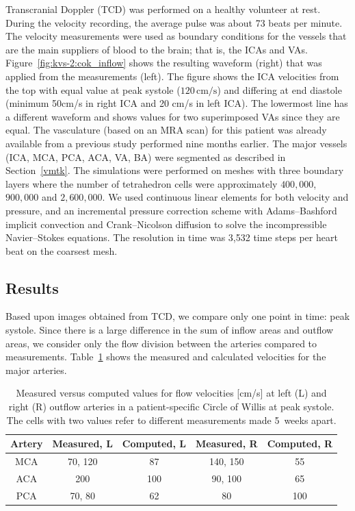 Transcranial Doppler (TCD) was performed on a healthy volunteer at
rest. During the velocity recording, the average pulse was about 73
beats per minute. The velocity measurements were used as boundary
conditions for the vessels that are the main suppliers of blood to the
brain; that is, the ICAs and VAs. Figure~\ref{fig:kvs-2:cok_inflow}
shows the resulting waveform (right) that was applied from the
measurements (left). The figure shows the ICA velocities from the top
with equal value at peak systole ($120\,\mathrm{cm}/\mathrm{s}$) and
differing at end diastole (minimum 50cm/s in right ICA and 20 cm/s in
left ICA). The lowermost line has a different waveform and shows
values for two superimposed VAs since they are equal. The vasculature
(based on an MRA scan) for this patient was already available from a
previous study performed nine months earlier. The major vessels (ICA,
MCA, PCA, ACA, VA, BA) were segmented as described in
Section~\ref{vmtk}. The simulations were performed on meshes with
three boundary layers where the number of tetrahedron cells were
approximately $400,000$, $900,000$ and $2,600,000$. We used continuous
linear elements for both velocity and pressure, and an incremental
pressure correction scheme with Adams--Bashford implicit convection
and Crank--Nicolson diffusion to solve the incompressible
Navier--Stokes equations. The resolution in time was 3,532 time steps
per heart beat on the coarsest mesh.

\subsection{Results}

Based upon images obtained from TCD, we compare only one point in
time: peak systole. Since there is a large difference in the sum of
inflow areas and outflow areas, we consider only the flow division
between the arteries compared to measurements.
Table~\ref{measure_vs_comp} shows the measured and calculated
velocities for the major arteries.

\begin{table}
  \centering
  \begin{tabular}{ccccc}
    \toprule
    Artery &Measured, L&Computed, L &Measured, R&Computed, R \\
    \midrule
    MCA & 70, 120 		& 87  & 140, 150 	& 55	\\
    ACA & 200  		& 100  	& 90, 100 	& 65	\\
    PCA & 70, 80  		& 62 	& 80  		& 100  \\
    \bottomrule
  \end{tabular}
  \caption{Measured versus computed values for flow
    velocities [cm/s] at left (L) and right (R) outflow arteries in a patient-specific Circle of Willis at peak
    systole. The cells with two values refer to different measurements
    made 5~weeks apart.}
  \label{measure_vs_comp}
\end{table}


